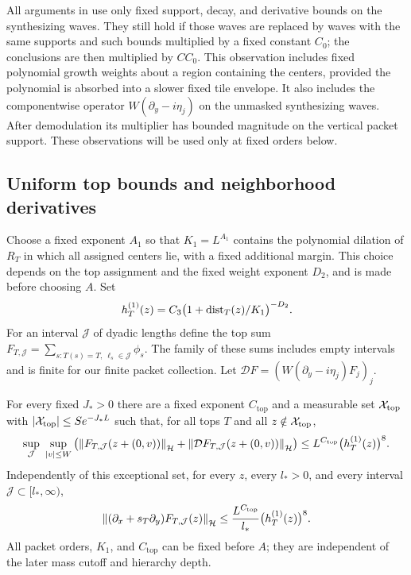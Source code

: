All arguments in  use only fixed support,
decay, and derivative bounds on the synthesizing waves.  They still
hold if those waves are replaced by waves with the same supports and
such bounds multiplied by a fixed constant $C_0$; the conclusions are
then multiplied by $C C_0$.  This observation includes fixed polynomial
growth weights about a region containing the centers, provided the
polynomial is absorbed into a slower fixed tile envelope.  It also
includes the componentwise operator $W(\partial_y-i\eta_j)$ on the
unmasked synthesizing waves.  After demodulation its multiplier has
bounded magnitude on the vertical packet support.  These observations
will be used only at fixed orders below.

\subsection{Uniform top bounds and neighborhood derivatives}

Choose a fixed exponent $A_1$ so that $K_1=L^{A_1}$ contains the
polynomial dilation of $R_T$ in which all assigned centers lie, with a
fixed additional margin.  This choice depends on the top assignment
and the fixed weight exponent $D_2$, and is made before choosing $A$.
Set
\[
 h_T^{(1)}(z)=C_3\big(1+\operatorname{dist}_T(z)/K_1\big)^{-D_2}.
\]
For an interval $\mathcal J$ of dyadic lengths define the top sum
$F_{T,\mathcal J}=\sum_{s:T(s)=T,\ \ell_s\in\mathcal J}\phi_s$.
The family of these sums includes empty intervals and is finite for
our finite packet collection.  Let
$\mathcal D F=(W(\partial_y-i\eta_j)F_j)_j$.

\begin{corollary}\label{conc:top-good}
For every fixed $J_*>0$ there are a fixed exponent $C_{\mathrm{top}}$ and a
measurable set $\mathcal X_{\rm top}$ with
$\left|\mathcal X_{\rm top}\right|\leq S e^{-J_*L}$ such that, for all tops
$T$ and all $z\notin\mathcal X_{\rm top}$,
\begin{equation}\label{eq:src-11}
 \sup_{\mathcal J}\ \sup_{\left|v\right|\leq W}
 \left(\left\|F_{T,\mathcal J}(z+(0,v))\right\|_{\mathcal H}
       +\left\|\mathcal D F_{T,\mathcal J}(z+(0,v))\right\|_{\mathcal H}\right)
 \leq L^{C_{\mathrm{top}}}\big(h_T^{(1)}(z)\big)^8.
\end{equation}
Independently of this exceptional set, for every $z$, every $l_*>0$,
and every interval $\mathcal J\subset[l_*,\infty)$,
\begin{equation}\label{conc:top-horizontal-derivative}
 \left\|(\partial_x+s_T\partial_y)F_{T,\mathcal J}(z)\right\|_{\mathcal H}
 \leq \frac{L^{C_{\mathrm{top}}}}{l_*}\big(h_T^{(1)}(z)\big)^8.
\end{equation}
All packet orders, $K_1$, and $C_{\mathrm{top}}$ can be fixed before $A$;
they are independent of the later mass cutoff and hierarchy depth.
\end{corollary}

